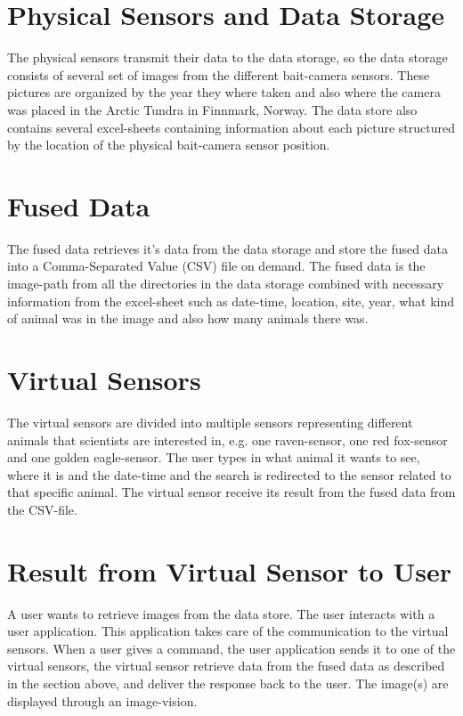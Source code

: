 \documentclass[USenglish]{uit-thesis}
\begin{document}
\section{Physical Sensors and Data Storage}
The physical sensors transmit their data to the data storage, so the data storage consists of several set of images from the different bait-camera sensors. These pictures are organized by the year they where taken and also where the camera was placed in the Arctic Tundra in Finnmark, Norway. 
The data store also contains several excel-sheets containing information about each picture structured by the location of the physical bait-camera sensor position.

\section{Fused Data}
The fused data retrieves it's data from the data storage and store the fused data into a Comma-Separated Value (CSV) file on demand. The fused data is the image-path from all the directories in the data storage combined with necessary information from the excel-sheet such as date-time, location, site, year, what kind of animal was in the image and also how many animals there was.

\section{Virtual Sensors}
The virtual sensors are divided into multiple sensors representing different animals that scientists are interested in, e.g. one raven-sensor, one red fox-sensor and one golden eagle-sensor.
The user types in what animal it wants to see, where it is and the date-time and the search is redirected to the sensor related to that specific animal. The virtual sensor receive its result from the fused data from the CSV-file.

\section{Result from Virtual Sensor to User}
A user wants to retrieve images from the data store.
The user interacts with a user application. This application takes care of the communication to the virtual sensors. When a user gives a command, the user application sends it to one of the virtual sensors, the virtual sensor retrieve data from the fused data as described in the section above, and deliver the response back to the user. The image(s) are displayed through an image-vision.
\end{document}
